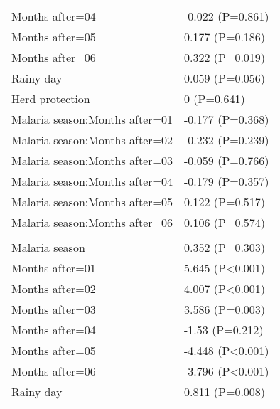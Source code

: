 \documentclass[]{article}
\begin{document}
\begin{longtable}[t]{ll}
\hspace{1em}Months after=04 & -0.022 (P=0.861)\\
\hspace{1em}Months after=05 & 0.177 (P=0.186)\\
\hspace{1em}Months after=06 & 0.322 (P=0.019)\\
\hspace{1em}Rainy day & 0.059 (P=0.056)\\
\hspace{1em}Herd protection & 0 (P=0.641)\\
\hspace{1em}Malaria season:Months after=01 & -0.177 (P=0.368)\\
\hspace{1em}Malaria season:Months after=02 & -0.232 (P=0.239)\\
\hspace{1em}Malaria season:Months after=03 & -0.059 (P=0.766)\\
\hspace{1em}Malaria season:Months after=04 & -0.179 (P=0.357)\\
\hspace{1em}Malaria season:Months after=05 & 0.122 (P=0.517)\\
\hspace{1em}Malaria season:Months after=06 & 0.106 (P=0.574)\\
\addlinespace[1.5em]
\multicolumn{2}{l}{\textbf{Temporary not field worker}}\\
\hspace{1em}Malaria season & 0.352 (P=0.303)\\
\hspace{1em}Months after=01 & 5.645 (P<0.001)\\
\hspace{1em}Months after=02 & 4.007 (P<0.001)\\
\hspace{1em}Months after=03 & 3.586 (P=0.003)\\
\hspace{1em}Months after=04 & -1.53 (P=0.212)\\
\hspace{1em}Months after=05 & -4.448 (P<0.001)\\
\hspace{1em}Months after=06 & -3.796 (P<0.001)\\
\hspace{1em}Rainy day & 0.811 (P=0.008)\\

\end{longtable}
\end{document}
